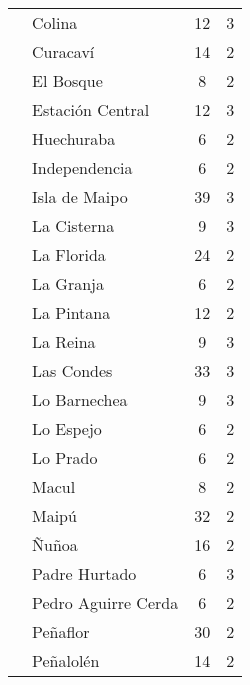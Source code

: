 \documentclass[
  12pt,
]{article}
\begin{document}
\begin{longtable}[t]{llcc}
\hspace{1em} & Colina & 12 & 3\\
\hspace{1em} & Curacaví & 14 & 2\\
\hspace{1em} & El Bosque & 8 & 2\\
\hspace{1em} & Estación Central & 12 & 3\\
\hspace{1em} & Huechuraba & 6 & 2\\
\hspace{1em} & Independencia & 6 & 2\\
\hspace{1em} & Isla de Maipo & 39 & 3\\
\hspace{1em} & La Cisterna & 9 & 3\\
\hspace{1em} & La Florida & 24 & 2\\
\hspace{1em} & La Granja & 6 & 2\\
\hspace{1em} & La Pintana & 12 & 2\\
\hspace{1em} & La Reina & 9 & 3\\
\hspace{1em} & Las Condes & 33 & 3\\
\hspace{1em} & Lo Barnechea & 9 & 3\\
\hspace{1em} & Lo Espejo & 6 & 2\\
\hspace{1em} & Lo Prado & 6 & 2\\
\hspace{1em} & Macul & 8 & 2\\
\hspace{1em} & Maipú & 32 & 2\\
\hspace{1em} & Ñuñoa & 16 & 2\\
\hspace{1em} & Padre Hurtado & 6 & 3\\
\hspace{1em} & Pedro Aguirre Cerda & 6 & 2\\
\hspace{1em} & Peñaflor & 30 & 2\\
\hspace{1em} & Peñalolén & 14 & 2\\

\end{longtable}
\end{document}
